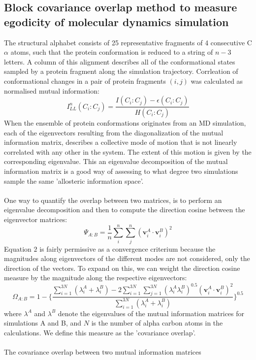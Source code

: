 \documentclass[11pt]{article}
\begin{document}
\subsection*{Block covariance overlap method to measure egodicity of molecular dynamics simulation} 
The structural alphabet consists of 25 representative fragments of 4 consecutive C$\alpha$ atoms, such that the protein conformation is reduced to a string of $n-3$ letters. A column of this alignment describes all of the conformational states sampled by a protein fragment along the simulation trajectory. Corrleation of conformational changes in a pair of protein fragments $(i, j)$ was calculated as normalised mutual information:
\begin{equation}
I_{LL}^{n} (C_{i}:C_{j}) = \frac{I(C_{i}:C_{j}) - \epsilon (C_{i}:C_{j})}{H(C_{i}:C_{j})}
\end{equation}
When the ensemble of protein conformations originates from an MD simulation, each of the eigenvectors resulting from the diagonalization of the mutual information matrix, describes a collective mode of motion that is not linearly correlated with any other in the system. The extent of this motion is given by the corresponding eigenvalue. This an eigenvalue decomposition of the mutual information matrix is a good way of assessing to what degree two simulations sample the same 'allosteric information space'.
\\
\\
One way to quantify the overlap between two matrices, is to perform an eigenvalue decomposition and then to compute the direction cosine between the eigenvector matrices:
\begin{equation}
\Psi_{A:B} = \frac{1}{n} \sum_{i}^{n} \sum_{j}^{n} (\textbf{v}_{i}^{A} \cdot \textbf{v}_{i}^{B})^{2}
\end{equation}
Equation $2$ is fairly permissive as a convergence criterium because the magnitudes along eigenvectors of the different modes are not considered, only the direction of the vectors. To expand on this, we can weight the direction cosine measure by the magnitude along the respective eigenvectors:
\begin{equation}
\Omega_{A:B} = 1 - \lbrace \frac{\sum_{i=1}^{3N}(\lambda_{i}^{A} + \lambda_{i}^{B}) - 2 \sum_{i=1}^{3N} \sum_{j=1}^{3N} (\lambda_{i}^{A} \lambda_{i}^{B})^{0.5} (\textbf{v}_{i}^{A} \cdot \textbf{v}_{i}^{B})^{2}}{\sum_{i=1}^{3N}(\lambda_{i}^{A} + \lambda_{i}^{B})} \rbrace ^{0.5}
\end{equation}
where $\lambda^{A}$ and $\lambda^{B}$ denote the eigenvalues of the mutual information matrices for simulations A and B, and $N$ is the number of alpha carbon atoms in the calculations. We define this measure as the 'covariance overlap'.
\\
\\
The covariance overlap between two mutual information matrices
\end{document}
